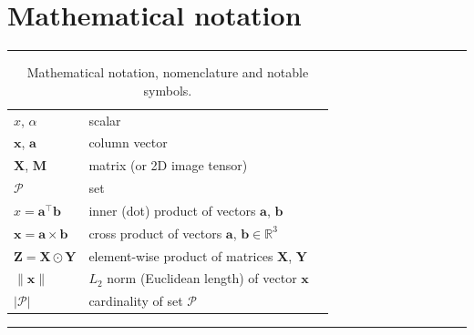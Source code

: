 \section{Mathematical notation}
\begin{table}[ht!]
	\centering
	\caption{Mathematical notation, nomenclature and notable symbols.}
	\noindent\rule{\textwidth}{0.5pt}
	\begin{tabular}{lll}
		$x$, $\alpha$ & scalar\\
		$\mathbf{x}$, $\mathbf{a}$ & column vector\\
		$\mathbf{X}$, $\mathbf{M}$ & matrix (or 2D image tensor)\\
        $\mathcal{P}$ & set \\
		$x = \mathbf{a}^\intercal\mathbf{b}$ & inner (dot) product of vectors $\mathbf{a}$, $\mathbf{b}$\\
		$\mathbf{x} = \mathbf{a}\times\mathbf{b}$ & cross product of vectors $\mathbf{a}$, $\mathbf{b} \in \mathbb{R}^3$\\
		$\mathbf{Z} = \mathbf{X}\odot\mathbf{Y}$ & element-wise product of matrices $\mathbf{X}$, $\mathbf{Y}$\\
        $\|\mathbf{x}\|$ & $L_2$ norm (Euclidean length) of vector $\mathbf{x}$ \\
        $|\mathcal{P}|$ & cardinality of set $\mathcal{P}$ \\
	\end{tabular}
	\noindent\rule{\textwidth}{0.5pt}
	\label{tab:mathematical_notation}
\end{table}
